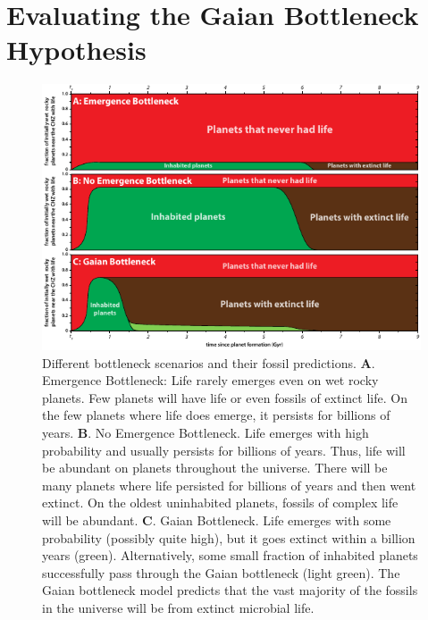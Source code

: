 \section{Evaluating the Gaian Bottleneck Hypothesis}

\begin{figure}[!b]
	\centering
	\includegraphics[width=0.9\linewidth]{figures/Summary.pdf}
	\caption[Different bottleneck scenarios]{Different bottleneck scenarios and their fossil predictions.
		\textbf{A}. Emergence Bottleneck: Life rarely emerges even on wet rocky planets. Few planets will have life or even fossils of extinct life.
		On the few planets where life does emerge, it persists for billions of years. 
		\textbf{B}. No Emergence Bottleneck.  Life emerges with high probability and usually persists for billions of years. Thus, life will be abundant on planets throughout the universe. There will be many planets where life persisted for billions of years and then went extinct. On the oldest uninhabited planets, fossils of complex  life will be abundant.
		\textbf{C}. Gaian Bottleneck. Life emerges with some probability (possibly quite high), but it goes extinct within a billion years (green). Alternatively, some small fraction of inhabited planets successfully pass through the Gaian bottleneck (light green). The Gaian bottleneck model predicts that the vast majority of the fossils in the universe will be from extinct microbial life.}
	\label{fig:summary}
\end{figure}

